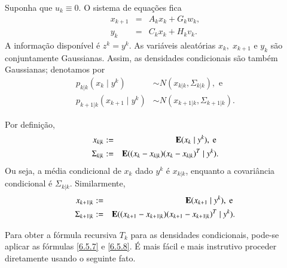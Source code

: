 Suponha que $u_k\equiv 0$. O sistema de equações fica
\begin{eqnarray}
x_{k+1}&=&A_kx_k+G_kw_k,\label{7.2.1}\\
y_k&=&C_kx_k+H_kv_k.\label{7.2.2}
\end{eqnarray}
A informação disponível é $z^k=y^k$. As variáveis aleatórias $x_k,\;x_{k+1}$ e $y_k$ são conjuntamente Gaussianas. Assim, as densidades condicionais são também Gaussianas; denotamos por 
\[
\begin{aligned}
p_{k|k}(x_k\;|\;y^k)&\sim N(x_{k|k}, \Sigma_{k|k}), \mbox{ e}\\
p_{k+1|k}(x_{k+1}\;|\;y^k)&\sim N(x_{k+1|k}, \Sigma_{k+1|k}).
\end{aligned}
\]

Por definição,
\begin{eqnarray}
x_{k|k} &:=& \operatorname{\bf E}(x_k\;|\;y^k), \mbox{ e }\nonumber\\
\Sigma_{k|k} &:=& \operatorname{\bf E}((x_k-x_{k|k})(x_k-x_{k|k})^T\;|\;y^k).\label{7.2.3}
\end{eqnarray}
Ou seja, a média condicional de $x_k$ dado $y^k$ é $x_{k|k}$, enquanto a covariância condicional é $\Sigma_{k|k}$. Similarmente,
\begin{eqnarray}
x_{k+1|k} &:=& \operatorname{\bf E}(x_{k+1}\;|\;y^k), \mbox{ e }\nonumber\\
\Sigma_{k+1|k} &:=& \operatorname{\bf E}((x_{k+1}-x_{k+1|k})(x_{k+1}-x_{k+1|k})^T\;|\;y^k).\label{7.2.4}
\end{eqnarray}

Para obter a fórmula recursiva $T_k$ para as densidades condicionais, pode-se aplicar as fórmulas \eqref{6.5.7} e \eqref{6.5.8}. É mais fácil e mais instrutivo proceder diretamente usando o seguinte fato.

